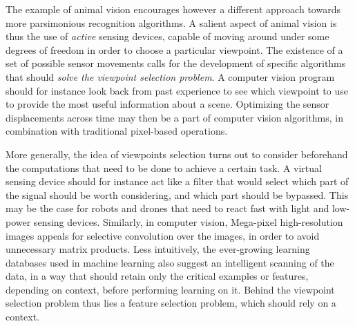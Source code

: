 \documentclass{article} %
\begin{document}
	The example of animal vision encourages however a different approach towards more parsimonious recognition algorithms. A salient aspect of animal vision is thus the use of \emph{active} sensing devices, capable of moving around under some degrees of freedom in order to choose a particular viewpoint. The existence of a set of possible sensor movements calls for the development of specific algorithms that should \emph{solve the viewpoint selection problem}. A computer vision program should for instance look back from past experience to see which viewpoint to use to provide the most useful information about a scene. Optimizing the sensor displacements across time may then be a part of computer vision algorithms, in combination with traditional pixel-based operations. 
	
	More generally, the idea of viewpoints selection turns out to consider beforehand the computations that need to be done to achieve a certain task. A virtual sensing device should for instance act like a filter that would select which part of the signal should be worth considering, and which part should be bypassed.  
	This may be the case for robots and drones  that need to react fast with light and low-power sensing devices. Similarly, in computer vision, Mega-pixel high-resolution images appeals for selective convolution over the images, in order to avoid unnecessary matrix products. Less intuitively, the ever-growing  learning databases used in machine learning also suggest an intelligent scanning of the data, in a way that should retain only the critical examples or features, depending on context, before performing learning on it.  
	Behind the viewpoint selection problem thus lies a feature selection problem, which should rely on a context. 
	
	
	
	
\end{document}
